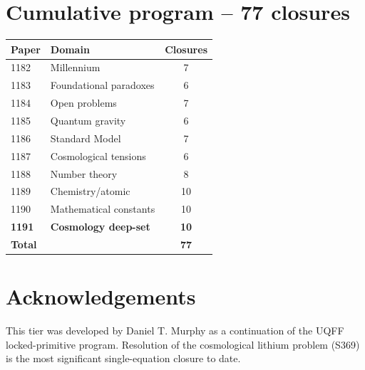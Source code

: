 \documentclass[11pt]{article}
\begin{document}
\section{Cumulative program -- 77 closures}
\begin{table}[h!]
\centering
\begin{tabular}{llc}
\toprule
Paper & Domain & Closures \\
\midrule
1182 & Millennium                  & 7 \\
1183 & Foundational paradoxes      & 6 \\
1184 & Open problems               & 7 \\
1185 & Quantum gravity             & 6 \\
1186 & Standard Model              & 7 \\
1187 & Cosmological tensions       & 6 \\
1188 & Number theory               & 8 \\
1189 & Chemistry/atomic            & 10 \\
1190 & Mathematical constants      & 10 \\
\textbf{1191} & \textbf{Cosmology deep-set} & \textbf{10} \\
\midrule
\textbf{Total} & & \textbf{77} \\
\bottomrule
\end{tabular}
\end{table}

\section*{Acknowledgements}
This tier was developed by Daniel T. Murphy as a continuation of the
UQFF locked-primitive program.  Resolution of the cosmological
lithium problem (S369) is the most significant single-equation
closure to date.
\end{document}

